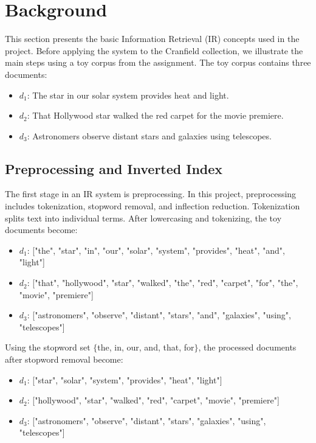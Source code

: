 \section{Background}\label{sec:background}

This section presents the basic Information Retrieval (IR) concepts used in the
project. Before applying the system to the Cranfield collection, we illustrate
the main steps using a toy corpus from the assignment. The toy corpus contains
three documents:

\begin{itemize}
    \item $d_1$: The star in our solar system provides heat and light.
    \item $d_2$: That Hollywood star walked the red carpet for the movie premiere.
    \item $d_3$: Astronomers observe distant stars and galaxies using telescopes.
\end{itemize}

\subsection{Preprocessing and Inverted Index}

The first stage in an IR system is preprocessing. In this project,
preprocessing includes tokenization, stopword removal, and inflection
reduction. Tokenization splits text into individual terms. After lowercasing
and tokenizing, the toy documents become:

\begin{itemize}
    \item $d_1$: ["the", "star", "in", "our", "solar", "system", "provides", "heat", "and", "light"]
    \item $d_2$: ["that", "hollywood", "star", "walked", "the", "red", "carpet", "for", "the", "movie", "premiere"]
    \item $d_3$: ["astronomers", "observe", "distant", "stars", "and", "galaxies", "using", "telescopes"]
\end{itemize}

Using the stopword set $\{$the, in, our, and, that, for$\}$, the processed
documents after stopword removal become:

\begin{itemize}
    \item $d_1$: ["star", "solar", "system", "provides", "heat", "light"]
    \item $d_2$: ["hollywood", "star", "walked", "red", "carpet", "movie", "premiere"]
    \item $d_3$: ["astronomers", "observe", "distant", "stars", "galaxies", "using", "telescopes"]
\end{itemize}

